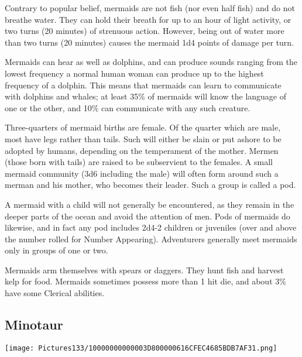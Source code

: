 \documentclass[a4paper,twoside,openany,10pt]{book}
\begin{document}
\begin{multicols}{2}
Contrary to popular belief, mermaids are not fish (nor even half fish) and do not breathe water. They can hold their breath for up to an hour of light activity, or two turns (20 minutes) of strenuous action. However, being out of water more than two turns (20 minutes) causes the mermaid 1d4 points of damage per turn.

Mermaids can hear as well as dolphins, and can produce sounds ranging from the lowest frequency a normal human woman can produce up to the highest frequency of a dolphin. This means that mermaids can learn to communicate with dolphins and whales; at least 35\% of mermaids will know the language of one or the other, and 10\% can communicate with any such creature.

Three-quarters of mermaid births are female. Of the quarter which are male, most have legs rather than tails. Such will either be slain or put ashore to be adopted by humans, depending on the temperament of the mother. Mermen (those born with tails) are raised to be subservient to the females. A small mermaid community (3d6 including the male) will often form around such a merman and his mother, who becomes their leader. Such a group is called a pod.

A mermaid with a child will not generally be encountered, as they remain in the deeper parts of the ocean and avoid the attention of men. Pods of mermaids do likewise, and in fact any pod includes 2d4-2 children or juveniles (over and above the number rolled for Number Appearing). Adventurers generally meet mermaids only in groups of one or two.

Mermaids arm themselves with spears or daggers. They hunt fish and harvest kelp for food. Mermaids sometimes possess more than 1 hit die, and about 3\% have some Clerical abilities.

\subsection*{Minotaur}\label{minotaur}


\begin{center} \texttt{[image: Pictures133/10000000000003D800000616CFEC4685BDB7AF31.png]} \end{center}


\end{multicols}
\end{document}
